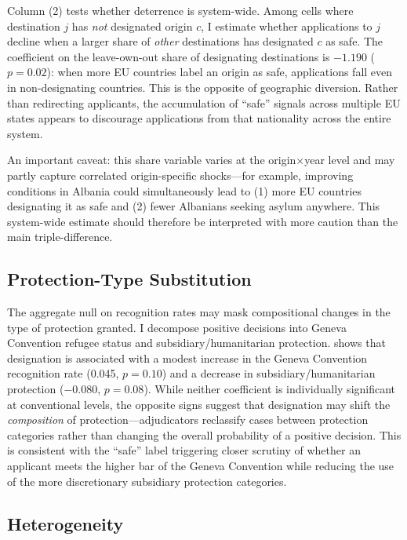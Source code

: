 \documentclass[12pt]{article}
\begin{document}
Column (2) tests whether deterrence is system-wide. Among cells where destination $j$ has \textit{not} designated origin $c$, I estimate whether applications to $j$ decline when a larger share of \textit{other} destinations has designated $c$ as safe. The coefficient on the leave-own-out share of designating destinations is $-1.190$ ($p = 0.02$): when more EU countries label an origin as safe, applications fall even in non-designating countries. This is the opposite of geographic diversion. Rather than redirecting applicants, the accumulation of ``safe'' signals across multiple EU states appears to discourage applications from that nationality across the entire system.

An important caveat: this share variable varies at the origin$\times$year level and may partly capture correlated origin-specific shocks---for example, improving conditions in Albania could simultaneously lead to (1) more EU countries designating it as safe and (2) fewer Albanians seeking asylum anywhere. This system-wide estimate should therefore be interpreted with more caution than the main triple-difference.



\subsection{Protection-Type Substitution}

The aggregate null on recognition rates may mask compositional changes in the type of protection granted. I decompose positive decisions into Geneva Convention refugee status and subsidiary/humanitarian protection.  shows that designation is associated with a modest increase in the Geneva Convention recognition rate (0.045, $p = 0.10$) and a decrease in subsidiary/humanitarian protection ($-0.080$, $p = 0.08$). While neither coefficient is individually significant at conventional levels, the opposite signs suggest that designation may shift the \textit{composition} of protection---adjudicators reclassify cases between protection categories rather than changing the overall probability of a positive decision. This is consistent with the ``safe'' label triggering closer scrutiny of whether an applicant meets the higher bar of the Geneva Convention while reducing the use of the more discretionary subsidiary protection categories.



\subsection{Heterogeneity}
\end{document}
